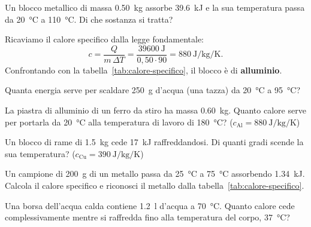 \begin{testexample}
Un blocco metallico di massa \SI{0,50}{\kilogram} assorbe \SI{39,6}{\kilo\joule} e la sua temperatura passa da \SI{20}{\celsius} a \SI{110}{\celsius}. Di che sostanza si tratta?

Ricaviamo il calore specifico dalla legge fondamentale:
\[ c = \frac{Q}{m\,\Delta T} = \frac{\SI{39600}{\joule}}{0{,}50 \cdot 90} = \SI{880}{\joule\per\kilogram\per\kelvin}. \]
Confrontando con la tabella~\ref{tab:calore-specifico}, il blocco è di \textbf{alluminio}.
\end{testexample}

\begin{esercizio}
Quanta energia serve per scaldare \SI{250}{\gram} d'acqua (una tazza) da \SI{20}{\celsius} a \SI{95}{\celsius}?\\
\end{esercizio}

\begin{esercizio}
La piastra di alluminio di un ferro da stiro ha massa \SI{0,60}{\kilogram}. Quanto calore serve per portarla da \SI{20}{\celsius} alla temperatura di lavoro di \SI{180}{\celsius}? ($c_{\text{Al}} = \SI{880}{\joule\per\kilogram\per\kelvin}$)\\
\end{esercizio}

\begin{esercizio}
Un blocco di rame di \SI{1,5}{\kilogram} cede \SI{17}{\kilo\joule} raffreddandosi. Di quanti gradi scende la sua temperatura? ($c_{\text{Cu}} = \SI{390}{\joule\per\kilogram\per\kelvin}$)\\
\end{esercizio}

\begin{esercizio}
Un campione di \SI{200}{\gram} di un metallo passa da \SI{25}{\celsius} a \SI{75}{\celsius} assorbendo \SI{1,34}{\kilo\joule}. Calcola il calore specifico e riconosci il metallo dalla tabella~\ref{tab:calore-specifico}.\\
\end{esercizio}

\begin{esercizio}
Una borsa dell'acqua calda contiene \SI{1,2}{\litre} d'acqua a \SI{70}{\celsius}. Quanto calore cede complessivamente mentre si raffredda fino alla temperatura del corpo, \SI{37}{\celsius}?\\
\end{esercizio}

